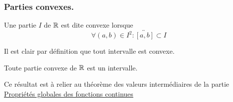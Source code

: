\subsubsection{Parties convexes.}
\begin{defi}
 Une partie $I$ de $\mathbb{R}$ est dite convexe lorsque 
\begin{displaymath}
 \forall (a,b)\in I^2 : \overleftrightarrow{[a,b]}\subset I
\end{displaymath}
\end{defi}
Il est clair par définition que tout intervalle est convexe.
\begin{prop}
 Toute partie convexe de $\mathbb{R}$ est un intervalle.
\end{prop}
Ce résultat est à relier au théorème des valeurs intermédiaires de la partie \href{\baseurl C2072.pdf}{Propriétés globales des fonctions continues}
